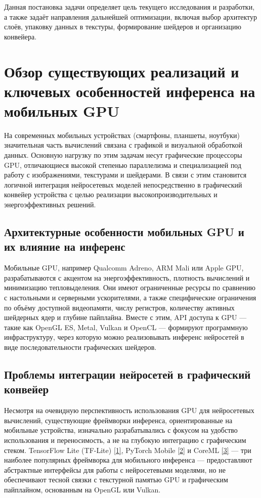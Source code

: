 \documentclass[a4paper,14pt]{extreport}
\begin{document}
        Данная постановка задачи определяет цель текущего исследования и разработки, а также задаёт направления дальнейшей оптимизации, включая выбор архитектур слоёв, упаковку данных в текстуры, формирование шейдеров и организацию конвейера.

        \section{Обзор существующих реализаций и ключевых особенностей инференса на мобильных GPU}
        На современных мобильных устройствах (смартфоны, планшеты, ноутбуки) значительная часть вычислений связана с графикой и визуальной обработкой данных. Основную нагрузку по этим задачам несут графические процессоры GPU, отличающиеся высокой степенью параллелизма и специализацией под работу с изображениями, текстурами и шейдерами. В связи с этим становится логичной интеграция нейросетевых моделей непосредственно в графический конвейер устройства с целью реализации высокопроизводительных и энергоэффективных решений.
        
            \subsection{Архитектурные особенности мобильных GPU и их влияние на инференс}
            Мобильные GPU, например Qualcomm Adreno, ARM Mali или Apple GPU, разрабатываются с акцентом на энергоэффективность, плотность вычислений и минимизацию тепловыделения. Они имеют ограниченные ресурсы по сравнению с настольными и серверными ускорителями, а также специфические ограничения по объёму доступной видеопамяти, числу регистров, количеству активных шейдерных ядер и глубине пайплайна. Вместе с этим, API доступа к GPU — такие как OpenGL ES, Metal, Vulkan и OpenCL — формируют программную инфраструктуру, через которую можно реализовывать инференс нейросетей в виде последовательности графических шейдеров.
            
            \subsection{Проблемы интеграции нейросетей в графический конвейер}
            Несмотря на очевидную перспективность использования GPU для нейросетевых вычислений, существующие фреймворки инференса, ориентированные на мобильные устройства, изначально разрабатывались с фокусом на удобство использования и переносимость, а не на глубокую интеграцию с графическим стеком. TensorFlow Lite (TF-Lite) \hyperlink{[1]}{[1]}, PyTorch Mobile \hyperlink{[2]}{[2]} и CoreML \hyperlink{[3]}{[3]} — три наиболее популярных фреймворка для мобильного инференса — предоставляют абстрактные интерфейсы для работы с нейросетевыми моделями, но не обеспечивают тесной связки с текстурной памятью GPU и графическим пайплайном, основанным на OpenGL или Vulkan.
            
\end{document}
